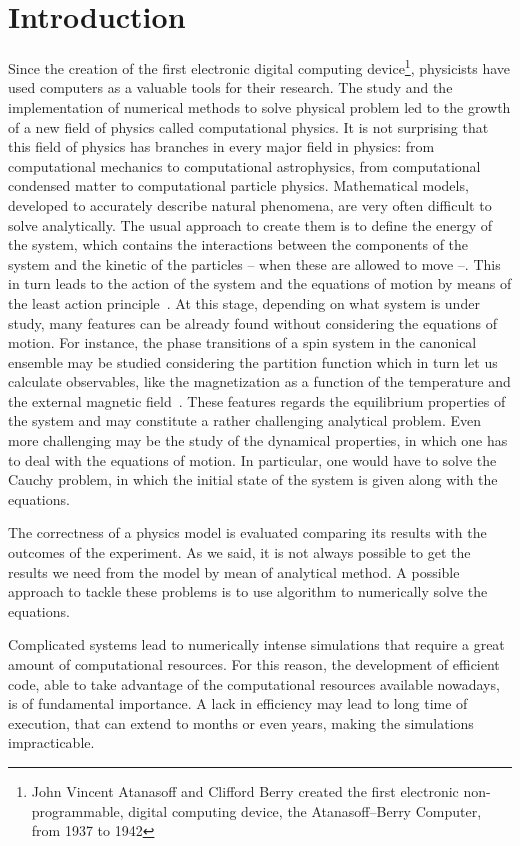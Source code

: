 \chapter{Introduction}
Since the creation of the first electronic digital computing device\footnote{John Vincent Atanasoff and Clifford Berry created the first electronic non-programmable, digital computing device, the Atanasoff–Berry Computer, from 1937 to 1942}, physicists have used computers as a valuable tools for their research. The study and the implementation of numerical methods to solve physical problem led to the growth of a new field of physics called computational physics. It is not surprising that this field of physics has branches in every major field in physics: from computational mechanics to computational astrophysics, from computational condensed matter to computational particle physics.
 Mathematical models, developed to accurately describe natural phenomena, are very often difficult to solve analytically. The usual approach to create them is to define the energy of the system, which contains the interactions between the components of the system and the kinetic of the particles -- when these are allowed to move --. This in turn leads to the action of the system and the equations of motion by means of the least action principle~\citep{LL85}. At this stage, depending on what system is under study, many features can be already found without considering the equations of motion. For instance, the phase transitions of a spin system in the canonical ensemble may be studied considering the partition function which in turn let us calculate observables, like the magnetization as a function of the temperature and the external magnetic field~\citep{Huang28}. These features regards the equilibrium properties of the system and may constitute a rather challenging analytical problem. Even more challenging may be the study of the dynamical properties, in which one has to deal with the equations of motion. In particular, one would have to solve the Cauchy problem, in which the initial state of the system is given along with the equations.

The correctness of a physics model is evaluated comparing its results with the outcomes of the experiment. As we said, it is not always possible to get the results we need from the model by mean of analytical method. A possible approach to tackle these problems is to use algorithm to numerically solve the equations.

Complicated systems lead to numerically intense simulations that require a great amount of computational resources. For this reason, the development of efficient code, able to take advantage of the computational resources available nowadays, is of fundamental importance. A lack in efficiency may lead to long time of execution, that can extend to months or even years, making the simulations impracticable. 

